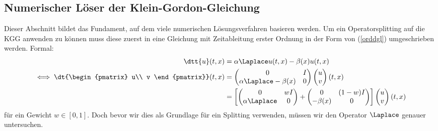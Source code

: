 \subsection{Numerischer Löser der Klein-Gordon-Gleichung}
\label{chapter:solver_kgg}
Dieser Abschnitt bildet das Fundament, auf dem viele numerischen Lösungsverfahren basieren werden. Um ein Operatorsplitting auf die KGG anwenden zu können muss diese zuerst in eine Gleichung mit Zeitableitung erster Ordnung in der Form von (\ref{orddgl}) umgeschrieben werden. Formal:
\begin{align}
\dtt{u}(t,x)&=\alpha \Laplace u(t,x) - \beta(x)u(t,x)\nonumber\\
\iff
\dt{\begin{pmatrix}
u\\
v
\end{pmatrix}}(t,x)&=
\begin{pmatrix}
0 & I\\
\alpha \Laplace - \beta(x) & 0
\end{pmatrix}
\begin{pmatrix}u\\v\end{pmatrix}(t,x)\nonumber\\
\label{eqn:formalsplit_kgg}
&=\left[\begin{pmatrix} 0 & wI\\ \alpha \Laplace & 0\end{pmatrix} 
+ \begin{pmatrix} 0 & (1-w)I\\ -\beta(x) & 0\end{pmatrix}\right]
\begin{pmatrix}u\\v\end{pmatrix}(t,x)
\end{align}
für ein Gewicht $w\in [0,1]$. Doch bevor wir dies als Grundlage für ein Splitting verwenden, müssen wir den Operator $\Laplace$ genauer untersuchen.
